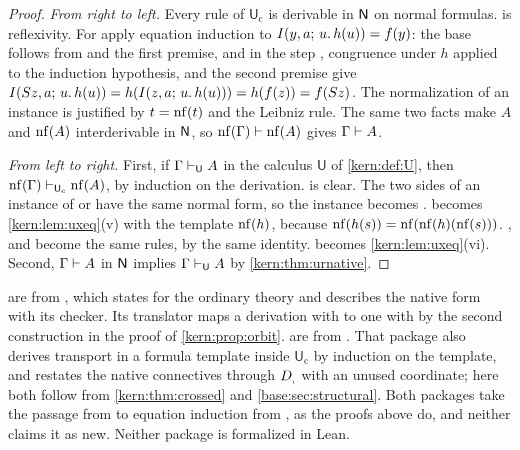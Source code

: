 \begin{proof}
\emph{From right to left.}  Every rule of $\mathsf{U}_{\mathrm{c}}$ is
derivable in $\mathsf{N}$ on normal formulas.   is reflexivity.  For
 apply equation induction to $I(y,a;\,u.\,h(u))=f(y)$: the
base follows from  and the first premise, and in the step
, congruence under $h$ applied to the induction hypothesis,
and the second premise give
$I(S z,a;\,u.\,h(u))=h(I(z,a;\,u.\,h(u)))=h(f(z))=f(S z)$.  The
normalization of an instance is justified by $t=\operatorname{nf}(t)$ and the Leibniz
rule.  The same two facts make $A$ and $\operatorname{nf}(A)$ interderivable in $\mathsf{N}$,
so $\operatorname{nf}(\Gamma)\vdash\operatorname{nf}(A)$ gives $\Gamma\vdash A$.

\emph{From left to right.}  First, if $\Gamma\vdash_{\mathsf{U}}A$ in the
calculus $\mathsf{U}$ of \cref{kern:def:U}, then
$\operatorname{nf}(\Gamma)\vdash_{\mathsf{U}_{\mathrm{c}}}\operatorname{nf}(A)$, by induction on the
derivation.   is clear.  The two sides of an instance of
 or  have the same normal form, so the instance
becomes .   becomes
\cref{kern:lem:uxeq}(v) with the template $\operatorname{nf}(h)$, because
$\operatorname{nf}(h(s))=\operatorname{nf}(\operatorname{nf}(h)(\operatorname{nf}(s)))$.  ,  and
 become the same rules, by the same identity.  
becomes \cref{kern:lem:uxeq}(vi).  Second, $\Gamma\vdash A$ in $\mathsf{N}$
implies $\Gamma\vdash_{\mathsf{U}}A$ by \cref{kern:thm:urnative}.
\end{proof}

\begin{remark}
\label{kern:rem:urforms-sources}
are from , which states  for the ordinary
theory and describes the native form with its checker.  Its translator maps
a derivation with  to one with  by the second
construction in the proof of \cref{kern:prop:orbit}.
 are from
.  That package also derives transport in a
formula template inside $\mathsf{U}_{\mathrm{c}}$ by induction on the
template, and restates the native connectives through $D_{,}$ with an
unused coordinate; here both follow from \cref{kern:thm:crossed} and
\cref{base:sec:structural}.  Both packages take the passage from
 to equation induction from , as the
proofs above do, and neither claims it as new.  Neither package is
formalized in Lean.
\end{remark}

